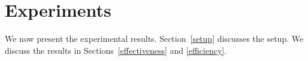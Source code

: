 \section{Experiments}
\label{experiment}

We now present the experimental results. Section~\ref{setup} discusses the setup. We discuss the results in Sections~\ref{effectiveness} and \ref{efficiency}. 





 